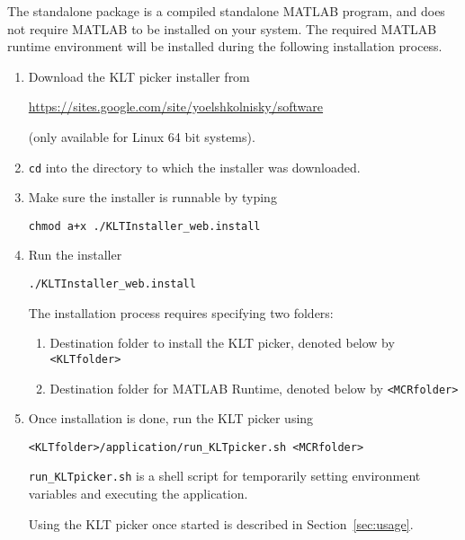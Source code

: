 \documentclass[12pt,a4paper]{article}
\begin{document}
The standalone package is a compiled standalone MATLAB program, and does not require MATLAB to be installed on your system. The required MATLAB runtime environment will be installed during the following installation process.

\begin{enumerate}
\item Download the KLT picker installer from
\begin{center}
\url{https://sites.google.com/site/yoelshkolnisky/software}
\end{center}
(only available for Linux 64 bit systems).

\item \texttt{cd} into the directory to which the installer was downloaded.
\item Make sure the installer is runnable by typing
\begin{center}
\texttt{chmod a+x ./KLTInstaller\_web.install}
\end{center}
\item Run the installer
\begin{center}
	\texttt{./KLTInstaller\_web.install}
\end{center}
The installation process requires specifying two folders:
\begin{enumerate}
\item Destination folder to install the KLT picker, denoted below by \texttt{<KLTfolder>}
\item Destination folder for MATLAB Runtime, denoted below by \texttt{<MCRfolder>}
\end{enumerate}
\item Once installation is done, run the KLT picker using
\begin{center}
\texttt{<KLTfolder>/application/run\_KLTpicker.sh <MCRfolder>}
\end{center}

\texttt{run\_KLTpicker.sh} is a shell script for temporarily setting environment variables and executing the application.

Using the KLT picker once started is described in Section~\ref{sec:usage}.


\end{enumerate}
\end{document}
